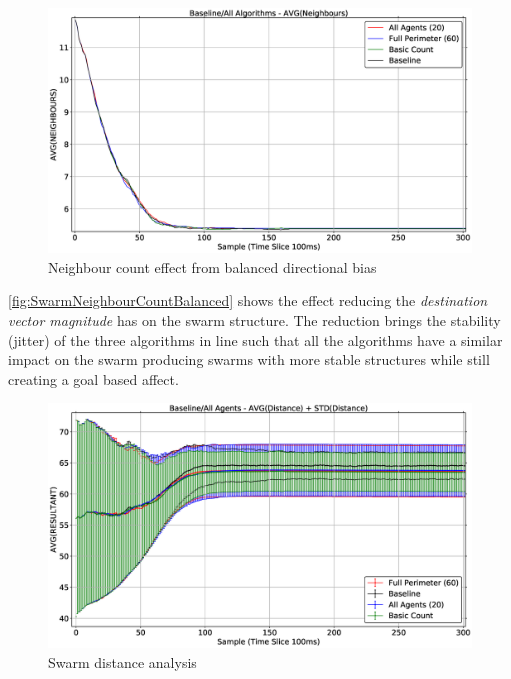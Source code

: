 \begin{figure}[H]
\begin{center}
\includegraphics[width=14cm]{CHAPTER-6/figures/SwarmNeighbourCountBalanced}
\end{center}
\caption{Neighbour count effect from balanced directional bias\label{fig:SwarmNeighbourCountBalanced}}
\end{figure}

\autoref{fig:SwarmNeighbourCountBalanced} shows the effect reducing the \textit{destination vector magnitude} has on the swarm structure. The reduction brings the stability (jitter) of the three algorithms in line such that all the algorithms have a similar impact on the swarm producing swarms with more stable structures while still creating a goal based affect. 

\begin{figure}[H]
\begin{center}
\includegraphics[width=14cm]{CHAPTER-6/figures/BaselineAll100-60-20-1}
\end{center}
\caption{Swarm distance analysis\label{fig:BaselineAll100-60-20-1}}
\end{figure}

